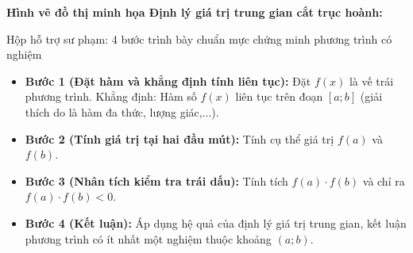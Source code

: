 \documentclass[12pt, a4paper]{article}
\begin{document}
\noindent \textbf{Hình vẽ đồ thị minh họa Định lý giá trị trung gian cắt trục hoành:}
\begin{center}
\end{center}

\begin{scaffoldbox}{Hộp hỗ trợ sư phạm: 4 bước trình bày chuẩn mực chứng minh phương trình có nghiệm}
\begin{itemize}[leftmargin=0.6cm]
    \item \textbf{Bước 1 (Đặt hàm và khẳng định tính liên tục):} Đặt $f(x)$ là vế trái phương trình. Khẳng định: Hàm số $f(x)$ liên tục trên đoạn $[a; b]$ (giải thích do là hàm đa thức, lượng giác,...).
    \item \textbf{Bước 2 (Tính giá trị tại hai đầu mút):} Tính cụ thể giá trị $f(a)$ và $f(b)$.
    \item \textbf{Bước 3 (Nhân tích kiểm tra trái dấu):} Tính tích $f(a) \cdot f(b)$ và chỉ ra $f(a) \cdot f(b) < 0$.
    \item \textbf{Bước 4 (Kết luận):} Áp dụng hệ quả của định lý giá trị trung gian, kết luận phương trình có ít nhất một nghiệm thuộc khoảng $(a; b)$.
\end{itemize}
\end{scaffoldbox}
\end{document}
